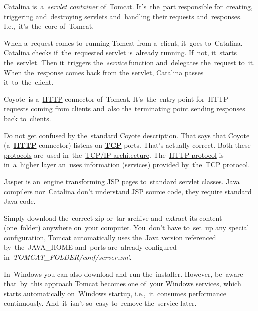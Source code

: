 Catalina is~a~\textit{servlet container} of~Tomcat.
It's~the~part responsible for~creating, triggering and~destroying \hyperref[servlet]{servlets} and~handling their requests and~responses.
I.e.,~it's~the~core of~Tomcat.

When a~request comes to~running Tomcat from a~client, it~goes to~Catalina.
Catalina checks if~the~requested servlet is~already running.
If~not, it~starts the~servlet.
Then it~triggers the~\textit{service} function and~delegates the~request to~it.
When the~response comes back from the~servlet, Catalina passes it~to~the~client.
\newpage

\label{coyote}
Coyote~is a~\hyperref[http]{HTTP} connector of~Tomcat.
It's~the~entry point for~HTTP requests coming from clients and~also the~terminating point sending responses back to~clients.

\warning Do not get confused by the~standard Coyote description.
That says that Coyote (a~\hyperref[http]{\textbf{HTTP}} connector) listens on \hyperref[tcp]{\textbf{TCP}} ports.
That's actually correct.
Both these \hyperref[protocolstandard]{protocols} are~used in~the~\hyperref[tcpip]{TCP/IP architecture}.
The~\hyperref[http]{HTTP protocol} is in~a~higher layer an~uses information (services) provided by~the~\hyperref[tcp]{TCP protocol}.

Jasper is an~\hyperref[engine]{engine} transforming \hyperref[jsp]{JSP} pages to~standard servlet classes.
Java compilers nor~\hyperref[catalina]{Catalina} don't understand JSP source code, they require standard Java code.

Simply download the~correct zip or~tar archive and~extract its content (one~folder) anywhere on~your computer.
You~don't have to~set~up any special configuration, Tomcat automatically uses the~Java version referenced by~the~JAVA\_HOME and~ports are~already configured in~\textit{TOMCAT\_FOLDER/conf/server.xml}.

\warning In~Windows you can also download and~run the~installer.
However, be~aware that~by~this approach Tomcat becomes one of~your Windows \hyperref[applicationprocessprogramservicethread]{services}, which starts automatically on~Windows startup, i.e.,~it~consumes performance continuously.
And~it~isn't so~easy to~remove the~service later.

